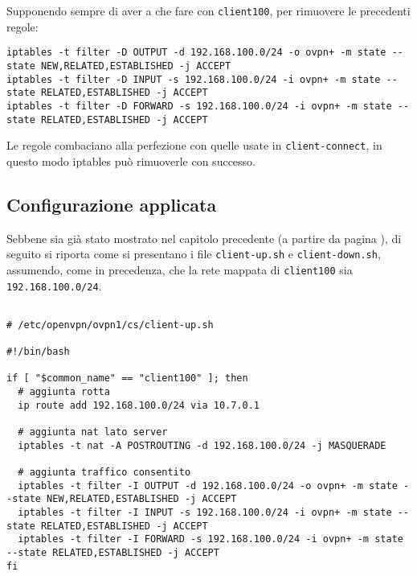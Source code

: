 		Supponendo sempre di aver a che fare con \texttt{client100}, per rimuovere le precedenti regole:
		\begin{verbatim}
iptables -t filter -D OUTPUT -d 192.168.100.0/24 -o ovpn+ -m state --state NEW,RELATED,ESTABLISHED -j ACCEPT
iptables -t filter -D INPUT -s 192.168.100.0/24 -i ovpn+ -m state --state RELATED,ESTABLISHED -j ACCEPT
iptables -t filter -D FORWARD -s 192.168.100.0/24 -i ovpn+ -m state --state RELATED,ESTABLISHED -j ACCEPT   
		\end{verbatim}
		Le regole combaciano alla perfezione con quelle usate in \texttt{client-connect}, in questo modo
		iptables può rimuoverle con successo.
		        
		
		\subsection{Configurazione applicata}
		Sebbene sia già stato mostrato nel capitolo precedente (a partire da pagina \pageref{sec:ending}),
		di seguito si riporta come si presentano i file \texttt{client-up.sh} e \texttt{client-down.sh},
		assumendo, come in precedenza, che la rete mappata di \texttt{client100} sia \texttt{192.168.100.0/24}.
		
		\begin{verbatim}
			
# /etc/openvpn/ovpn1/cs/client-up.sh
			
#!/bin/bash
			                
if [ "$common_name" == "client100" ]; then
  # aggiunta rotta
  ip route add 192.168.100.0/24 via 10.7.0.1
			
  # aggiunta nat lato server
  iptables -t nat -A POSTROUTING -d 192.168.100.0/24 -j MASQUERADE
			        
  # aggiunta traffico consentito
  iptables -t filter -I OUTPUT -d 192.168.100.0/24 -o ovpn+ -m state --state NEW,RELATED,ESTABLISHED -j ACCEPT
  iptables -t filter -I INPUT -s 192.168.100.0/24 -i ovpn+ -m state --state RELATED,ESTABLISHED -j ACCEPT
  iptables -t filter -I FORWARD -s 192.168.100.0/24 -i ovpn+ -m state --state RELATED,ESTABLISHED -j ACCEPT
fi
		\end{verbatim}
		        
